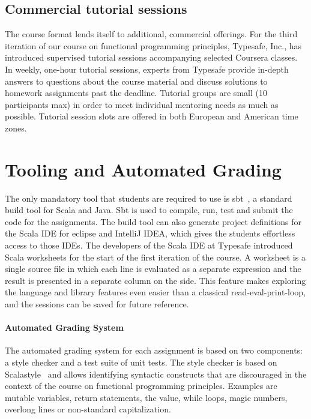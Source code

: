 \documentclass{sig-alternate}
\begin{document}
\subsection{Commercial tutorial sessions}

The course format lends itself to additional, commercial offerings. For the
third iteration of our course on functional programming principles, Typesafe, Inc.,
has introduced supervised tutorial sessions accompanying selected Coursera
classes. In weekly, one-hour tutorial sessions, experts from Typesafe provide
in-depth answers to questions about the course material and discuss solutions
to homework assignments past the deadline. Tutorial groups are small (10
participants max) in order to meet individual mentoring needs as much as
possible. Tutorial session slots are offered in both European and American
time zones.

\section{Tooling and Automated Grading}
\label{sec:tooling-automated-grading}

The only mandatory tool that students are required to use is sbt~\cite{sbt}, a
standard build tool for Scala and Java. Sbt is used to compile, run, test and
submit the code for the assignments. The build tool can also generate project
definitions for the Scala IDE for eclipse and IntelliJ IDEA, which gives the
students effortless access to those IDEs. The developers of the Scala IDE at
Typesafe introduced Scala worksheets for the start of the first iteration
of the course. A worksheet is a single source file in which each line is
evaluated as a separate expression and the result is presented in a separate
column on the side. This feature makes exploring the language and library
features even easier than a classical read-eval-print-loop, and the sessions
can be saved for future reference.

\paragraph{Automated Grading System}

The automated grading system for each assignment is based on two components: a
style checker and a test suite of unit tests. The style checker is based on
Scalastyle~\cite{ScalaStyle} and allows identifying syntactic constructs that
are discouraged in the context of the course on functional programming principles.
Examples are mutable variables, return statements, the \lstinline@null@ value,
while loops, magic numbers, overlong lines or non-standard capitalization.
\end{document}
